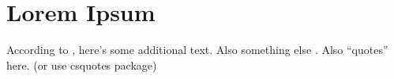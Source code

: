 \documentclass[10pt, letterpaper]{article}  %
\begin{document}






\section{Lorem Ipsum}
\lipsum[1-5]
According to \cite{Goodfellow_Goodfellow_Wilson_Hunt_2010}, here's some additional text. Also something else \citep{Szelogowski_2022}. Also ``quotes'' here. (or use csquotes package)





\pagebreak

\end{document}

